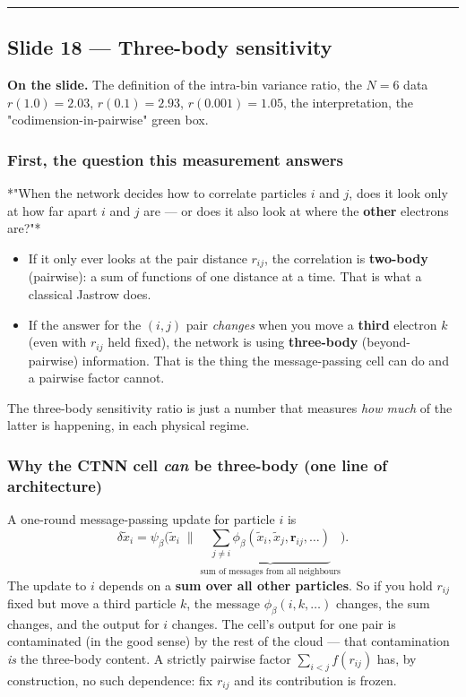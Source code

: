\documentclass[11pt]{article}
\begin{document}
\vspace{4pt}\hrule\vspace{8pt}

\subsection*{Slide 18 --- Three-body sensitivity}

\textbf{On the slide.} The definition of the intra-bin variance ratio, the
$N = 6$ data $r(1.0) = 2.03$, $r(0.1) = 2.93$, $r(0.001) = 1.05$, the
interpretation, the "codimension-in-pairwise" green box.

\subsubsection*{First, the question this measurement answers}

*"When the network decides how to correlate particles $i$ and $j$, does it
look only at how far apart $i$ and $j$ are --- or does it also look at where
the \textbf{other} electrons are?"*

\begin{itemize}
\item If it only ever looks at the pair distance $r_{ij}$, the correlation is
\textbf{two-body} (pairwise): a sum of functions of one distance at a time.
That is what a classical Jastrow does.
\item If the answer for the $(i,j)$ pair \emph{changes} when you move a \textbf{third}
electron $k$ (even with $r_{ij}$ held fixed), the network is using
\textbf{three-body} (beyond-pairwise) information. That is the thing the
message-passing cell can do and a pairwise factor cannot.
\end{itemize}
The three-body sensitivity ratio is just a number that measures \emph{how much}
of the latter is happening, in each physical regime.

\subsubsection*{Why the CTNN cell \emph{can} be three-body (one line of architecture)}

A one-round message-passing update for particle $i$ is
\[\delta\tilde x_i = \psi_\beta\Big(\tilde x_i \;\Big\|\;
   \underbrace{\textstyle\sum_{j \ne i}\phi_\beta(\tilde x_i, \tilde x_j,
   \mathbf r_{ij}, \ldots)}_{\text{sum of messages from all neighbours}}\Big).\]
The update to $i$ depends on a \textbf{sum over all other particles}. So if you
hold $r_{ij}$ fixed but move a third particle $k$, the message
$\phi_\beta(i,k,\ldots)$ changes, the sum changes, and the output for $i$
changes. The cell's output for one pair is contaminated (in the good sense)
by the rest of the cloud --- that contamination \emph{is} the three-body content.
A strictly pairwise factor $\sum_{i<j} f(r_{ij})$ has, by construction, no
such dependence: fix $r_{ij}$ and its contribution is frozen.
\end{document}
